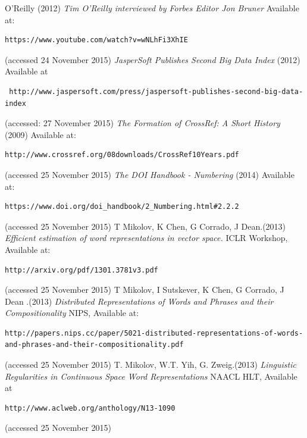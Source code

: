 \documentclass[11pt, oneside]{article}   	%
\begin{document}
\begin{thebibliography}{9}
 O'Reilly (2012) \emph{Tim O'Reilly interviewed by Forbes Editor Jon Bruner} Available at: \begin{verbatim}https://www.youtube.com/watch?v=wNLhFi3XhIE \end{verbatim} (accessed 24 November 2015)
\emph{JasperSoft Publishes Second Big Data Index} (2012) Available at
\begin{verbatim} http://www.jaspersoft.com/press/jaspersoft-publishes-second-big-data-index \end{verbatim} (accessed: 27 November 2015)
\emph{The Formation of CrossRef: A Short History} (2009) Available at: 
\begin{verbatim}http://www.crossref.org/08downloads/CrossRef10Years.pdf\end{verbatim} (accessed 25 November 2015)
\emph{The DOI Handbook - Numbering} (2014) Available at: \begin{verbatim}https://www.doi.org/doi_handbook/2_Numbering.html#2.2.2\end{verbatim} (accessed 25 November 2015) 
T Mikolov, K Chen, G Corrado, J Dean.(2013) \emph{Efficient estimation of word representations in vector space. } ICLR Workshop, Available at: \begin{verbatim}http://arxiv.org/pdf/1301.3781v3.pdf\end{verbatim} (accessed 25 November 2015) 
T Mikolov, I Sutskever, K Chen, G Corrado, J Dean .(2013) \emph{Distributed Representations of Words and Phrases and their Compositionality} NIPS,  Available at: \begin{verbatim}http://papers.nips.cc/paper/5021-distributed-representations-of-words-and-phrases-and-their-compositionality.pdf\end{verbatim} (accessed 25 November 2015) 
T. Mikolov, W.T. Yih, G. Zweig.(2013) \emph{Linguistic Regularities in Continuous Space Word Representations} NAACL HLT, Available at \begin{verbatim}http://www.aclweb.org/anthology/N13-1090\end{verbatim} (accessed 25 November 2015) 

\end{thebibliography}
\end{document}
